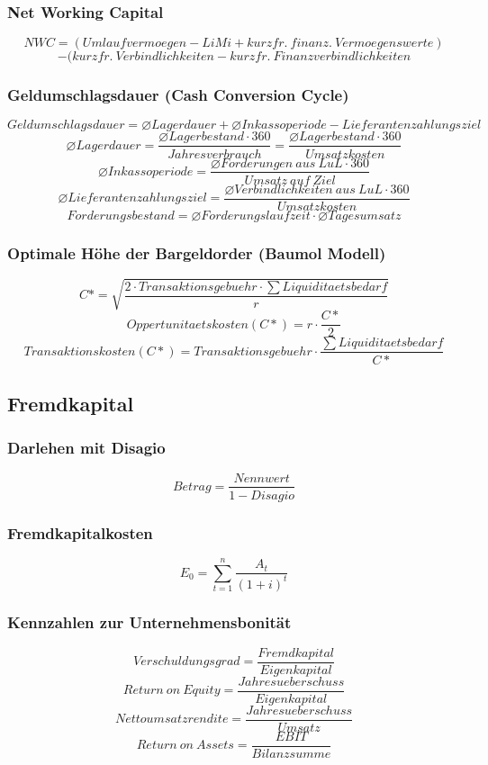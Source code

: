 \subsubsection{Net Working Capital}
\[NWC = (Umlaufvermoegen - LiMi + kurzfr.~finanz.~Vermoegenswerte)\]
\[- (kurzfr.~Verbindlichkeiten - kurzfr.~Finanzverbindlichkeiten\]

\subsubsection{Geldumschlagsdauer (Cash Conversion Cycle)}
\[Geldumschlagsdauer = \varnothing Lagerdauer + \varnothing Inkassoperiode - Lieferantenzahlungsziel\]
\[\varnothing Lagerdauer = \frac{\varnothing Lagerbestand \cdot 360}{Jahresverbrauch} = \frac{\varnothing Lagerbestand \cdot 360}{Umsatzkosten}\]
\[\varnothing Inkassoperiode = \frac{\varnothing Forderungen~aus~LuL \cdot 360}{Umsatz~auf~Ziel}\]
\[\varnothing Lieferantenzahlungsziel = \frac{\varnothing Verbindlichkeiten~aus~LuL \cdot 360}{Umsatzkosten}\]
\[Forderungsbestand = \varnothing Forderungslaufzeit \cdot \varnothing Tagesumsatz\]

\subsubsection{Optimale Höhe der Bargeldorder (Baumol Modell)}
\[C* = \sqrt{\frac{2 \cdot Transaktionsgebuehr \cdot \sum Liquiditaetsbedarf}{r}}\]
\[Oppertunitaetskosten(C*) = r \cdot \frac{C*}{2}\]
\[Transaktionskosten(C*) = Transaktionsgebuehr \cdot \frac{\sum Liquiditaetsbedarf}{C*}\]

\subsection{Fremdkapital}

\subsubsection{Darlehen mit Disagio}
\[Betrag = \frac{Nennwert}{1 - Disagio}\]

\subsubsection{Fremdkapitalkosten}
\[E_0 = \sum_{t=1}^{n} \frac{A_t}{(1+i)^t}\]

\subsubsection{Kennzahlen zur Unternehmensbonität}
\[Verschuldungsgrad = \frac{Fremdkapital}{Eigenkapital}\]
\[Return~on~Equity = \frac{Jahresueberschuss}{Eigenkapital}\]
\[Nettoumsatzrendite = \frac{Jahresueberschuss}{Umsatz}\]
\[Return~on~Assets = \frac{EBIT}{Bilanzsumme}\]

